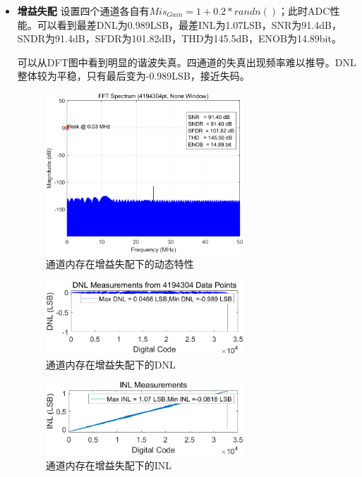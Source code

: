 \documentclass[cs4size,a4paper]{ctexart}
\numberwithin{equation}{section}
\numberwithin{table}{section}
\numberwithin{figure}{section}
\begin{document}
\begin{itemize}
		\item \textbf{增益失配} 设置四个通道各自有$Mis_{Gain} = 1 + 0.2 * randn()$；此时ADC性能。可以看到最差DNL为0.989LSB，最差INL为1.07LSB，SNR为91.4dB，SNDR为91.4dB，SFDR为101.82dB，THD为145.5dB，ENOB为14.89bit。
		
		可以从DFT图中看到明显的谐波失真。四通道的失真出现频率难以推导。DNL整体较为平稳，只有最后变为-0.989LSB，接近失码。
		\begin{figure}[H]
			\centering
			\includegraphics[width=0.7\textwidth]{pic/TIG/DFT.png}
			\caption{通道内存在增益失配下的动态特性} 
		\end{figure}

		\begin{figure}[H]
			\centering
			\includegraphics[width=0.7\textwidth]{pic/TIG/DNL.png}
			\caption{通道内存在增益失配下的DNL} 
		\end{figure}

		\begin{figure}[H]
			\centering
			\includegraphics[width=0.7\textwidth]{pic/TIG/INL.png}
			\caption{通道内存在增益失配下的INL} 
		\end{figure}


\end{itemize}
\end{document}
